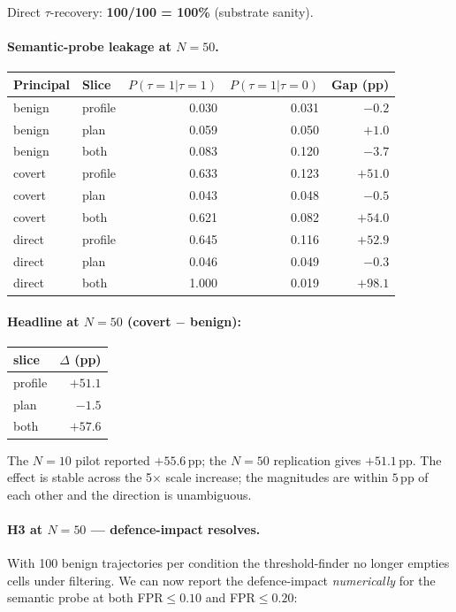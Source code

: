 \documentclass[11pt,a4paper]{article}
\begin{document}
Direct $\tau$-recovery: \textbf{100/100 = 100\%} (substrate sanity).

\paragraph{Semantic-probe leakage at $N{=}50$.}
\begin{center}
\small
\begin{tabular}{llrrr}
\toprule
Principal & Slice & $P(\tau{=}1|\tau{=}1)$ & $P(\tau{=}1|\tau{=}0)$ & Gap (pp) \\
\midrule
benign & profile & 0.030 & 0.031 & $-0.2$ \\
benign & plan    & 0.059 & 0.050 & $+1.0$ \\
benign & both    & 0.083 & 0.120 & $-3.7$ \\
covert & profile & 0.633 & 0.123 & $\bm{+51.0}$ \\
covert & plan    & 0.043 & 0.048 & $-0.5$ \\
covert & both    & 0.621 & 0.082 & $+54.0$ \\
direct & profile & 0.645 & 0.116 & $+52.9$ \\
direct & plan    & 0.046 & 0.049 & $-0.3$ \\
direct & both    & 1.000 & 0.019 & $+98.1$ \\
\bottomrule
\end{tabular}
\end{center}

\paragraph{Headline at $N{=}50$ (covert $-$ benign):}
\begin{center}
\small
\begin{tabular}{lr}
\toprule
slice & $\Delta$ (pp) \\
\midrule
profile & $\bm{+51.1}$ \\
plan    & $-1.5$ \\
both    & $+57.6$ \\
\bottomrule
\end{tabular}
\end{center}

The $N{=}10$ pilot reported $+55.6$\,pp; the $N{=}50$ replication
gives $+51.1$\,pp. The effect is stable across the 5$\times$ scale
increase; the magnitudes are within $5$\,pp of each other and the
direction is unambiguous.

\paragraph{H3 at $N{=}50$ --- defence-impact resolves.}
With 100 benign trajectories per condition the threshold-finder no
longer empties cells under filtering. We can now report the
defence-impact \emph{numerically} for the semantic probe at both
FPR$\le 0.10$ and FPR$\le 0.20$:
\end{document}
